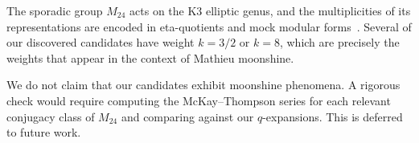 The sporadic group $M_{24}$ acts on the K3 elliptic
genus, and the multiplicities of its representations
are encoded in eta-quotients and mock modular
forms~\cite{ono2004}.  Several of our discovered
candidates have weight $k = 3/2$ or $k = 8$, which are
precisely the weights that appear in the context of
Mathieu moonshine.

\begin{remark}
We do not claim that our candidates exhibit moonshine
phenomena.  A rigorous check would require computing
the McKay--Thompson series for each relevant conjugacy
class of $M_{24}$ and comparing against our $q$-expansions.
This is deferred to future work.
\end{remark}
